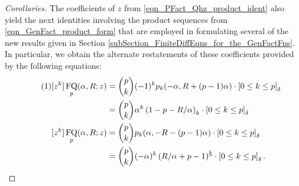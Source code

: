 \documentclass[12pt,reqno]{article}
\numberwithin{sfootnote}{section}
\numberwithin{equation}{section}
\newcommand{\tagonce}[0]{
     \addtocounter{equation}{1}
     \tag{\theequation}
}
\theoremstyle{plain}
\theoremstyle{definition}
\theoremstyle{remark}
\newcommand{\FFactII}[2]{\ensuremath{#1^{\underline{#2}}}}
\newcommand{\Pochhammer}[2]{\ensuremath{\left(#1\right)_{#2}}}
\newcommand{\Iverson}[1]{\ensuremath{\left[#1\right]_{\delta}}}
\DeclareMathOperator{\FQ}{FQ}
\begin{document}
\begin{proof}[Corollaries] 
The coefficients of $z$ from \eqref{eqn_PFact_Qhz_product_ident} 
also yield the next identities involving the product sequences from 
\eqref{eqn_GenFact_product_form} 
that are employed in formulating several of the new results given 
in Section \ref{subSection_FiniteDiffEqns_for_the_GenFactFns}. 
In particular, we obtain the alternate restatements of these 
coefficients provided by the following equations: 
\begin{align*} 
\tagonce\label{eqn_CoeffsOfzk_FQhaRz_restmts_by_GenProductSeqs-v1} 
[z^k] \FQ_p(\alpha, R; z) & = 
     \binom{p}{k} (-1)^{k} 
     p_k(-\alpha, R + (p-1) \alpha) 
     \cdot \Iverson{0 \leq k \leq p} \\ 
     & = 
     \binom{p}{k} \alpha^{k} \Pochhammer{1-p-R / \alpha}{k} 
     \cdot \Iverson{0 \leq k \leq p} \\ 
[z^k] \FQ_p(\alpha, R; z) & = 
     \binom{p}{k} p_k(\alpha, -R - (p-1) \alpha) 
     \cdot \Iverson{0 \leq k \leq p} \\ 
     & = 
     \binom{p}{k} (-\alpha)^{k} \FFactII{\left(R / \alpha + p-1\right)}{k} 
     \cdot \Iverson{0 \leq k \leq p}. 
\qedhere 
\end{align*} 
\end{proof} 
\end{document}
